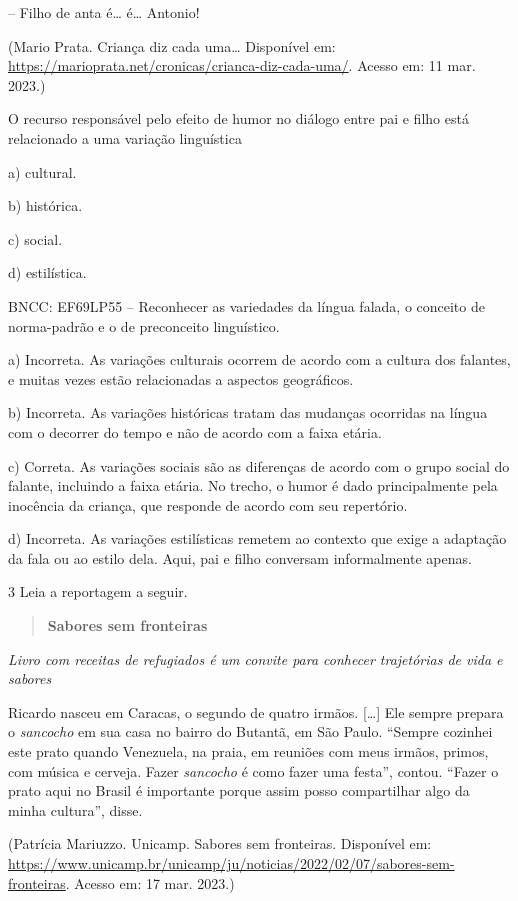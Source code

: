 -- Filho de anta é\ldots{} é\ldots{} Antonio!

(Mario Prata. Criança diz cada uma\ldots{} Disponível em: 
\url{https://marioprata.net/cronicas/crianca-diz-cada-uma/}.
Acesso em: 11 mar. 2023.)

O recurso responsável pelo efeito de humor no diálogo entre pai e filho
está relacionado a uma variação linguística

a) cultural.

b) histórica.

c) social.

d) estilística.

BNCC: EF69LP55 -- Reconhecer as variedades da língua falada, o conceito
de norma-padrão e o de preconceito linguístico.

a) Incorreta. As variações culturais ocorrem de acordo com a cultura dos
falantes, e muitas vezes estão relacionadas a aspectos geográficos.

b) Incorreta. As variações históricas tratam das mudanças ocorridas na
língua com o decorrer do tempo e não de acordo com a faixa etária.

c) Correta. As variações sociais são as diferenças de acordo com o grupo
social do falante, incluindo a faixa etária. No trecho, o humor é dado
principalmente pela inocência da criança, que responde de acordo com seu
repertório.

d) Incorreta. As variações estilísticas remetem ao contexto que exige a
adaptação da fala ou ao estilo dela. Aqui, pai e filho conversam
informalmente apenas.

\num{3} Leia a reportagem a seguir.

\begin{quote}
\textbf{Sabores sem fronteiras}
\end{quote}

\emph{Livro com receitas de refugiados é um convite para conhecer
trajetórias de vida e sabores}

Ricardo nasceu em Caracas, o segundo de quatro irmãos. {[}\ldots{]} Ele
sempre prepara o \emph{sancocho} em sua casa no bairro do Butantã, em
São Paulo. ``Sempre cozinhei este prato quando Venezuela, na praia, em
reuniões com meus irmãos, primos, com música e cerveja. Fazer
\emph{sancocho} é como fazer uma festa'', contou. ``Fazer o prato aqui
no Brasil é importante porque assim posso compartilhar algo da minha
cultura'', disse.

(Patrícia Mariuzzo. Unicamp. Sabores sem fronteiras. Disponível em:
\url{https://www.unicamp.br/unicamp/ju/noticias/2022/02/07/sabores-sem-fronteiras}.
Acesso em: 17 mar. 2023.)

